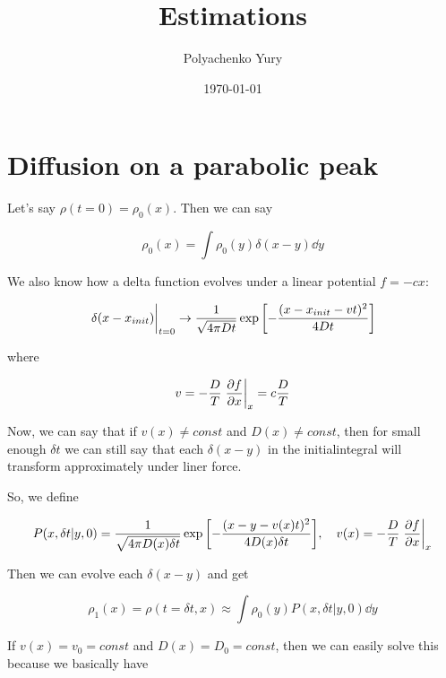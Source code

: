\documentclass[a4paper,12pt]{article} %
\author{Polyachenko Yury}
\title{Estimations}
\date{\today}
\begin{document}

\clearpage\maketitle
\thispagestyle{empty}

\newpage

\section{Diffusion on a parabolic peak}

Let's say $\rho(t=0) = \rho_0(x)$. Then we can say

\begin{equation}
\rho_0(x) = \int \rho_0(y) \delta (x-y) \dd y
\end{equation}

We also know how a delta function evolves under a linear potential $f=-cx$:

\begin{equation}
\eval{\delta(x - x_{init})}_{t=0} \to \frac{1}{\sqrt{4 \pi D t}} \exp \qty[-\frac{(x - x_{init} - vt)^2}{4 D t}]
\end{equation}

where 

\begin{equation}
v = - \frac{D}{T} \eval{\pdv{f}{x}}_x = c \frac{D}{T}
\end{equation}

Now, we can say that if $v(x) \neq const$ and $D(x) \neq const$, then for small enough $\delta t$ we can still say that each $\delta(x-y)$ in the initialintegral will transform approximately under liner force.

So, we define 

\begin{equation}
P(x, \delta t | y, 0) = \frac{1}{\sqrt{4 \pi D(x) \delta t}} \exp \qty[-\frac{(x - y - v(x) t)^2}{4 D(x) \delta t}], \hspace{10pt} v(x) = - \frac{D}{T} \eval{\pdv{f}{x}}_x
\end{equation}

Then we can evolve each $\delta(x-y)$ and get 

\begin{equation} \label{eq:rho1_general}
\rho_1(x) = \rho(t=\delta t, x) \approx \int \rho_0(y) P(x, \delta t | y, 0) \dd y
\end{equation}

If $v(x) = v_0 = const$ and $D(x) = D_0 = const$, then we can easily solve this because we basically have 
\end{document}
